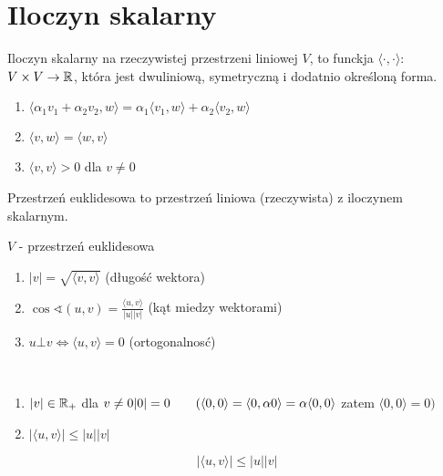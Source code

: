 \section{Iloczyn skalarny} 
\begin{df} 
    Iloczyn skalarny na rzeczywistej przestrzeni liniowej $V$, 
    to funckja $\langle \cdot, \cdot \rangle$: $V \times V \to \mathbb{R}$, która jest 
    dwuliniową, symetryczną i dodatnio określoną forma. 
    \begin{enumerate}[(1)] 
        \item $\langle \alpha_1 v_1 + \alpha_2 v_2, w \rangle = 
            \alpha_1 \langle v_1, w \rangle + \alpha_2 \langle v_2, w \rangle$
        \item $\langle v, w \rangle = \langle w, v\rangle$ 
        \item $\langle v, v \rangle > 0 $ dla $v \neq 0$ 
    \end{enumerate} 
\end{df} 
\begin{df} 
    Przestrzeń euklidesowa to przestrzeń liniowa (rzeczywista) z iloczynem skalarnym. 
\end{df} 
\begin{df} 
    $V$ - przestrzeń euklidesowa 
    \begin{enumerate}[(1)]
        \item $|v| = \sqrt{ \langle v, v \rangle}$ (długość wektora)
        \item $\cos\sphericalangle(u,v) = \frac{\langle u, v \rangle}{|u||v|}$ (kąt 
            miedzy wektorami)
        \item $u \bot v \Leftrightarrow \langle u, v \rangle = 0$ (ortogonalnosć)
    \end{enumerate} 
\end{df} 
\begin{uw} ~\hfill
    \begin{enumerate}[(1)] 
        \item $|v| \in \mathbb{R}_+$ dla $v \neq 0 \\
            |0| = 0 \qquad(\langle 0, 0 \rangle = \langle 0, \alpha 0 \rangle = \alpha 
            \langle 0 , 0 \rangle$ zatem $\langle 0, 0 \rangle = 0)$
        \item $| \langle u, v \rangle | \le |u| |v|$ 
    \end{enumerate} 
\end{uw} 
\begin{ft} \[ | \langle u, v \rangle | \le |u| |v| \] \end{ft} 
